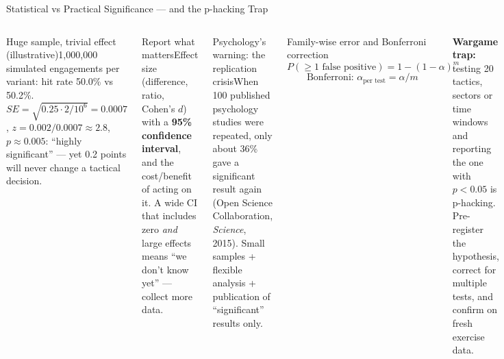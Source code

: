 \documentclass[aspectratio=169,10pt,t]{beamer}
\begin{document}
\begin{frame}{Statistical vs Practical Significance --- and the p-hacking Trap}
\begin{columns}[T]
\begin{cbox}[ISSAnavy]{Huge sample, trivial effect (illustrative)}\scriptsize 1,000,000 simulated engagements per variant: hit rate 50.0\% vs 50.2\%. $SE=\sqrt{0.25\cdot2/10^6}=0.0007$, $z=0.002/0.0007\approx2.8$, $p\approx0.005$: ``highly significant'' --- yet 0.2 points will never change a tactical decision.\end{cbox}
\begin{cbox}[ISSAgrn]{Report what matters}\scriptsize Effect size (difference, ratio, Cohen's $d$) with a \textbf{95\% confidence interval}, and the cost/benefit of acting on it. A wide CI that includes zero \emph{and} large effects means ``we don't know yet'' --- collect more data.\end{cbox}
\begin{cbox}[violet]{Psychology's warning: the replication crisis}\scriptsize When 100 published psychology studies were repeated, only about 36\% gave a significant result again (Open Science Collaboration, \textit{Science}, 2015). Small samples + flexible analysis + publication of ``significant'' results only.\end{cbox}
\begin{fbx}{Family-wise error and Bonferroni correction}\[P(\ge1\text{ false positive})=1-(1-\alpha)^{m}\]\[\text{Bonferroni: }\alpha_{\text{per test}}=\alpha/m\]\end{fbx}
\begin{wbox}\scriptsize\textbf{Wargame trap:} testing 20 tactics, sectors or time windows and reporting the one with $p<0.05$ is p-hacking. Pre-register the hypothesis, correct for multiple tests, and confirm on fresh exercise data.\end{wbox}
\end{columns}
\end{frame}
\end{document}
